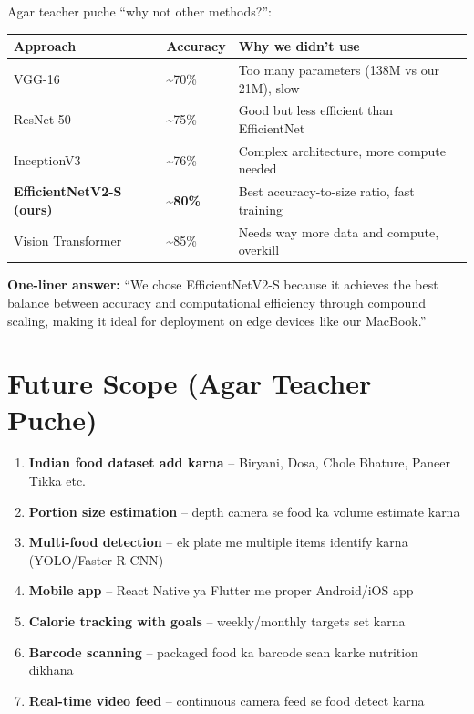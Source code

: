 \documentclass[11pt,a4paper]{article}
\begin{document}
Agar teacher puche ``why not other methods?'':

\begin{tabularx}{\textwidth}{l l X}
\toprule
\textbf{Approach} & \textbf{Accuracy} & \textbf{Why we didn't use} \\
\midrule
VGG-16 & \textasciitilde70\% & Too many parameters (138M vs our 21M), slow \\
ResNet-50 & \textasciitilde75\% & Good but less efficient than EfficientNet \\
InceptionV3 & \textasciitilde76\% & Complex architecture, more compute needed \\
\textbf{EfficientNetV2-S (ours)} & \textbf{\textasciitilde80\%} & Best accuracy-to-size ratio, fast training \\
Vision Transformer & \textasciitilde85\% & Needs way more data and compute, overkill \\
\bottomrule
\end{tabularx}

\begin{tipbox}
\textbf{One-liner answer:} ``We chose EfficientNetV2-S because it achieves the best balance between accuracy and computational efficiency through compound scaling, making it ideal for deployment on edge devices like our MacBook.''
\end{tipbox}

\section{Future Scope (Agar Teacher Puche)}

\begin{enumerate}[leftmargin=1.2cm]
\item \textbf{Indian food dataset add karna} -- Biryani, Dosa, Chole Bhature, Paneer Tikka etc.
\item \textbf{Portion size estimation} -- depth camera se food ka volume estimate karna
\item \textbf{Multi-food detection} -- ek plate me multiple items identify karna (YOLO/Faster R-CNN)
\item \textbf{Mobile app} -- React Native ya Flutter me proper Android/iOS app
\item \textbf{Calorie tracking with goals} -- weekly/monthly targets set karna
\item \textbf{Barcode scanning} -- packaged food ka barcode scan karke nutrition dikhana
\item \textbf{Real-time video feed} -- continuous camera feed se food detect karna
\end{enumerate}
\end{document}
